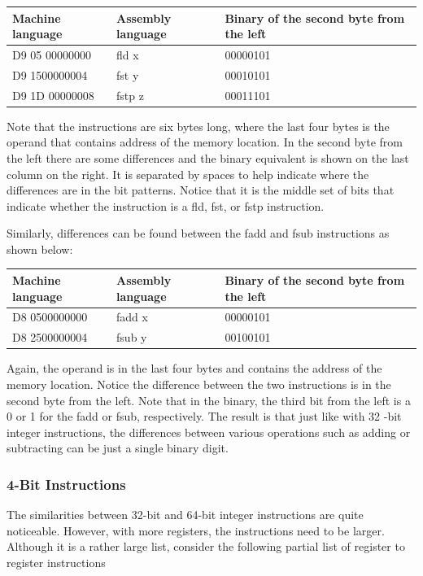 \documentclass[10pt]{article}
\begin{document}
\begin{center}
\begin{tabular}{|l|l|l|}
\hline
Machine language & Assembly language & Binary of the second byte from the left \\
\hline
D9 05 00000000 & fld x & 00000101 \\
\hline
D9 1500000004 & fst y & 00010101 \\
\hline
D9 1D 00000008 & fstp z & 00011101 \\
\hline
\end{tabular}
\end{center}

Note that the instructions are six bytes long, where the last four bytes is the operand that contains address of the memory location. In the second byte from the left there are some differences and the binary equivalent is shown on the last column on the right. It is separated by spaces to help indicate where the differences are in the bit patterns. Notice that it is the middle set of bits that indicate whether the instruction is a fld, fst, or fstp instruction.

Similarly, differences can be found between the fadd and fsub instructions as shown below:

\begin{center}
\begin{tabular}{|l|l|l|}
\hline
Machine language & Assembly language & Binary of the second byte from the left \\
\hline
D8 0500000000 & fadd x & 00000101 \\
\hline
D8 2500000004 & fsub y & 00100101 \\
\hline
\end{tabular}
\end{center}

Again, the operand is in the last four bytes and contains the address of the memory location. Notice the difference between the two instructions is in the second byte from the left. Note that in the binary, the third bit from the left is a 0 or 1 for the fadd or fsub, respectively. The result is that just like with 32 -bit integer instructions, the differences between various operations such as adding or subtracting can be just a single binary digit.

\subsubsection*{4-Bit Instructions}
The similarities between 32-bit and 64-bit integer instructions are quite noticeable. However, with more registers, the instructions need to be larger. Although it is a rather large list, consider the following partial list of register to register instructions
\end{document}
